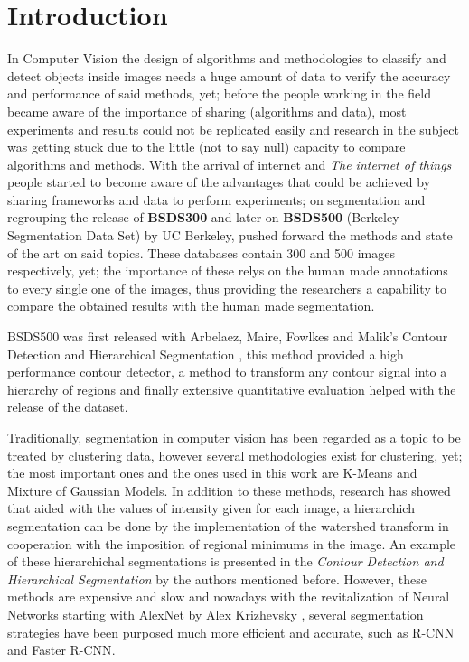 \documentclass[10pt,twocolumn,letterpaper]{article}
\begin{document}
\section{Introduction}
In Computer Vision the design of algorithms and methodologies to classify and detect objects inside images needs a huge amount of data to verify the accuracy and performance of said methods, yet; before the people working in the field became aware of  the importance of sharing (algorithms and data), most experiments and results could not be replicated easily and research in the subject was getting stuck due to the little (not to say null) capacity to compare algorithms and methods. With the arrival of internet and \textit{The internet of things} people started to become aware of the advantages that could be achieved by sharing frameworks and data to perform experiments; on segmentation and regrouping the release of \textbf{BSDS300} and later on \textbf{BSDS500} (Berkeley Segmentation Data Set) by UC Berkeley, pushed forward the methods and state of the art on said topics. These databases contain 300 and 500 images respectively, yet; the importance of these relys on the human made annotations to every single one of the images, thus providing the researchers a capability to compare the obtained results with the human made segmentation.

BSDS500 was first released with Arbel\´aez, Maire, Fowlkes and Malik's Contour Detection and Hierarchical Segmentation \cite{amfm_pami2011}, this method provided a high performance contour detector, a method to transform any contour signal into a hierarchy of regions and finally extensive quantitative evaluation helped with the release of the dataset.

Traditionally, segmentation in computer vision has been regarded as a topic to be treated by clustering data, however several methodologies exist for clustering, yet; the most important ones and the ones used in this work are K-Means and Mixture of Gaussian Models. In addition to these methods, research has showed that aided with the values of intensity given for each image, a hierarchich segmentation can be done by the implementation of the watershed transform in cooperation with the imposition of regional minimums in the image. An example of these hierarchichal segmentations is presented in the \textit{Contour Detection and Hierarchical Segmentation} by the authors mentioned before\cite{amfm_pami2011}.
However, these methods are expensive and slow and nowadays with the revitalization of Neural Networks starting with AlexNet by Alex Krizhevsky \cite{NIPS2012_4824}, several segmentation strategies have been purposed much more efficient and accurate, such as R-CNN \cite{girshick2014rcnn} and Faster R-CNN\cite{girshick15fastrcnn}.
\end{document}

